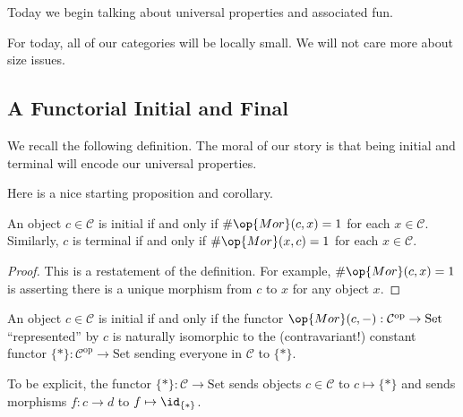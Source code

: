 
Today we begin talking about universal properties and associated fun.
\begin{convention}
	For today, all of our categories will be locally small. We will not care more about size issues.
\end{convention}

\subsection{A Functorial Initial and Final}
We recall the following definition.
\initialfinaldefi*
\noindent The moral of our story is that being initial and terminal will encode our universal properties.

Here is a nice starting proposition and corollary.
\begin{proposition}
	An object $c\in\mathcal C$ is initial if and only if $\#\op{Mor}(c,x)=1$ for each $x\in\mathcal C$. Similarly, $c$ is terminal if and only if $\#\op{Mor}(x,c)=1$ for each $x\in\mathcal C$.
\end{proposition}
\begin{proof}
	This is a restatement of the definition. For example, $\#\op{Mor}(c,x)=1$ is asserting there is a unique morphism from $c$ to $x$ for any object $x$.
\end{proof}
\begin{corollary} \label{cor:representinit}
	An object $c\in\mathcal C$ is initial if and only if the functor $\op{Mor}(c,-):\mathcal C^{\mathrm{op}}\to\mathrm{Set}$ ``represented'' by $c$ is naturally isomorphic to the (contravariant!) constant functor $\{*\}:\mathcal C^{\mathrm{op}}\to\mathrm{Set}$ sending everyone in $\mathcal C$ to $\{*\}$.
\end{corollary}
To be explicit, the functor $\{*\}:\mathcal C\to\mathrm{Set}$ sends objects $c\in\mathcal C$ to $c\mapsto\{*\}$ and sends morphisms $f:c\to d$ to $f\mapsto\id_{\{*\}}$.
